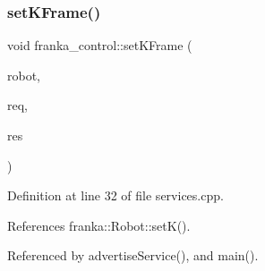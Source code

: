 \subsubsection{\texorpdfstring{set\+K\+Frame()}{setKFrame()}}
{\footnotesize\ttfamily void franka\+\_\+control\+::set\+K\+Frame (\begin{DoxyParamCaption}\item[{\hyperlink{classfranka_1_1Robot}{franka\+::\+Robot} \&}]{robot,  }\item[{const Set\+K\+Frame\+::\+Request \&}]{req,  }\item[{Set\+K\+Frame\+::\+Response \&}]{res }\end{DoxyParamCaption})}



Definition at line 32 of file services.\+cpp.



References franka\+::\+Robot\+::set\+K().



Referenced by advertise\+Service(), and main().


